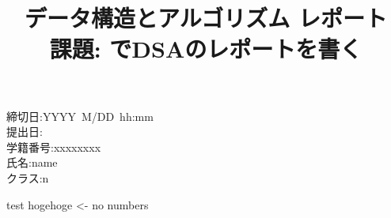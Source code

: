 \documentclass{article}
\title{\bf データ構造とアルゴリズム レポート \\ 課題: \LuaLaTeX でDSAのレポートを書く}
\author{}
\date{}
\begin{document}
\maketitle

\begin{description}
	\item[\rm \large 締切日:YYYY\, M/DD\, hh:mm]
	\item[\rm \large 提出日: \editdate ]
	\item[\rm \large 学籍番号:xxxxxxxx]
	\item[\rm \large 氏名:name]
	\item[\rm \large クラス:n]
\end{description}

\begin{result}[numbers=left]{test}
hogehoge
<- no numbers
\end{result}



\end{document}
